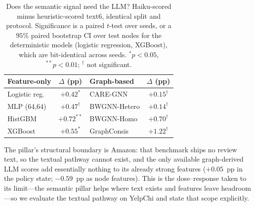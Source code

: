 \documentclass{conf}
\begin{document}
\begin{table}[t]
\centering
\caption{Does the semantic signal need the LLM? Haiku-scored minus
heuristic-scored text6, identical split and protocol. Significance is a paired
$t$-test over seeds, or a $95\%$ paired bootstrap CI over test nodes for the
deterministic models (logistic regression, XGBoost), which are bit-identical
across seeds. $^{*}p<0.05$, $^{**}p<0.01$; $^{\dagger}$ not significant.}
\label{tab:headtohead}
\begin{tabular}{lc|lc}
\toprule
Feature-only & $\Delta$ (pp) & Graph-based & $\Delta$ (pp) \\
\midrule
Logistic reg. & $+0.42^{*}$  & CARE-GNN     & $+0.15^{\dagger}$ \\
MLP (64,64)   & $+0.47^{\dagger}$ & BWGNN-Hetero & $+0.14^{\dagger}$ \\
HistGBM       & $+0.72^{**}$ & BWGNN-Homo   & $+0.70^{\dagger}$ \\
XGBoost       & $+0.55^{*}$  & GraphConsis  & $+1.22^{\dagger}$ \\
\bottomrule
\end{tabular}
\end{table}

The pillar's structural boundary is Amazon: that benchmark ships no review
text, so the textual pathway cannot exist, and the only available graph-derived
LLM scores add essentially nothing to its already strong features ($+0.05$~pp
in the policy state; $-0.59$~pp as node features). This is the dose--response
taken to its limit---the semantic pillar helps where text exists and features
leave headroom---so we evaluate the textual pathway on YelpChi and state that
scope explicitly.

\end{document}
